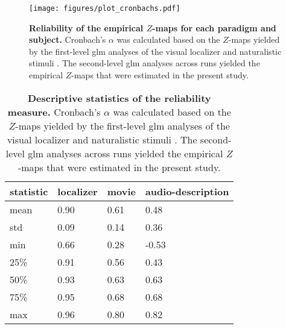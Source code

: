 



\begin{figure*}[tbp] \centering
    \texttt{[image: figures/plot\_cronbachs.pdf]}
    \caption{\textbf{Reliability of the empirical $Z$-maps for each paradigm
    and subject.}
    Cronbach's $\alpha$ was calculated based on the $Z$-maps yielded by the
    first-level \ac{glm} analyses of the visual localizer
    \citep[four runs;][]{sengupta2016extension} and naturalistic stimuli
    \citep[eight runs;][]{haeusler2022processing}.
    The second-level \ac{glm} analyses across runs yielded the empirical
    $Z$-maps that were estimated in the present study.
    }
\label{fig:cronbachs}
\end{figure*}


\begin{table*}[btp]
\centering
    \caption{
    \textbf{Descriptive statistics of the reliability measure.}
    Cronbach's $\alpha$ was calculated based on the $Z$-maps yielded by the
    first-level \ac{glm} analyses of the visual localizer
    \citep[four runs;][]{sengupta2016extension} and naturalistic stimuli
    \citep[eight runs;][]{haeusler2022processing}.
    The second-level \ac{glm} analyses across runs yielded the empirical
    $Z$-maps that were estimated in the present study.
    }
\label{tab:cronbachs}
\begin{tabular}{llll}
    \toprule
    \textbf{statistic} & \textbf{localizer} & \textbf{movie} & \textbf{audio-description} \\
    \midrule
    mean & 0.90 & 0.61 & 0.48 \tabularnewline
    std & 0.09 & 0.14 & 0.36 \tabularnewline
    min & 0.66 & 0.28 & -0.53 \tabularnewline
    25\% & 0.91 & 0.56 & 0.43 \tabularnewline
    50\% & 0.93 & 0.63 & 0.63 \tabularnewline
    75\% & 0.95 & 0.68 & 0.68 \tabularnewline
    max & 0.96 & 0.80 & 0.82 \tabularnewline
    \bottomrule
\end{tabular}
\end{table*}



